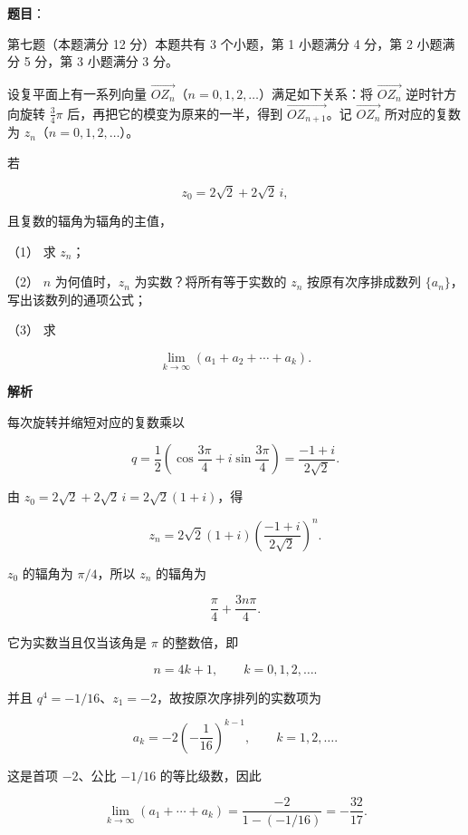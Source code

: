 \begin{answer}

\textbf{题目}：

第七题（本题满分 12 分）本题共有 3 个小题，第 1 小题满分 4 分，第 2 小题满分 5 分，第 3 小题满分 3 分。

设复平面上有一系列向量 $\overrightarrow{OZ_n}$（$n=0,1,2,\ldots$）满足如下关系：将 $\overrightarrow{OZ_n}$ 逆时针方向旋转 $\frac34\pi$ 后，再把它的模变为原来的一半，得到 $\overrightarrow{OZ_{n+1}}$。记 $\overrightarrow{OZ_n}$ 所对应的复数为 $z_n$（$n=0,1,2,\ldots$）。

若

\nopagebreak[4]
\[
z_0=2\sqrt2+2\sqrt2\,i,
\]

且复数的辐角为辐角的主值，

（1） 求 $z_n$；

（2） $n$ 为何值时，$z_n$ 为实数？将所有等于实数的 $z_n$ 按原有次序排成数列 $\{a_n\}$，写出该数列的通项公式；

（3） 求

\nopagebreak[4]
\[
\lim_{k\to\infty}(a_1+a_2+\cdots+a_k).
\]

\textbf{解析}

每次旋转并缩短对应的复数乘以

\nopagebreak[4]
\[
q=\frac12\left(\cos\frac{3\pi}{4}
+i\sin\frac{3\pi}{4}\right)
=\frac{-1+i}{2\sqrt2}.
\]


由 $z_0=2\sqrt2+2\sqrt2\,i=2\sqrt2(1+i)$，得

\nopagebreak[4]
\[
z_n=2\sqrt2(1+i)
\left(\frac{-1+i}{2\sqrt2}\right)^n.
\]


$z_0$ 的辐角为 $\pi/4$，所以 $z_n$ 的辐角为

\nopagebreak[4]
\[
\frac\pi4+\frac{3n\pi}{4}.
\]

它为实数当且仅当该角是 $\pi$ 的整数倍，即

\nopagebreak[4]
\[
n=4k+1,\qquad k=0,1,2,\ldots.
\]

并且 $q^4=-1/16$、$z_1=-2$，故按原次序排列的实数项为

\nopagebreak[4]
\[
a_k=-2\left(-\frac1{16}\right)^{k-1},
\qquad k=1,2,\ldots.
\]


这是首项 $-2$、公比 $-1/16$ 的等比级数，因此

\nopagebreak[4]
\[
\lim_{k\to\infty}(a_1+\cdots+a_k)
=\frac{-2}{1-(-1/16)}
=-\frac{32}{17}.
\]




\end{answer}